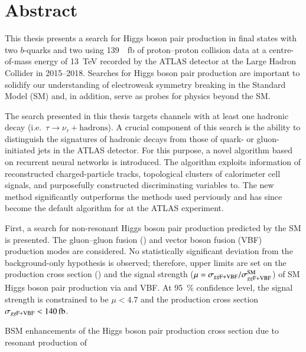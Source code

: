 \chapter*{Abstract}


This thesis presents a search for Higgs boson pair production in final states
with two $b$-quarks and two \tauleptons using \SI{139}{\per\femto\barn} of
proton--proton collision data at a centre-of-mass energy of \SI{13}{\TeV}
recorded by the ATLAS detector at the Large Hadron Collider in 2015--2018.
Searches for Higgs boson pair production are important to solidify our
understanding of electroweak symmetry breaking in the Standard Model (SM) and,
in addition, serve as probes for physics beyond the SM.

The search presented in this thesis targets channels with at least one hadronic
\taulepton decay (i.e.~$\tau \to \nu_{\tau} + \text{hadrons}$). A crucial
component of this search is the ability to distinguish the signatures of
hadronic \taulepton decays from those of quark- or gluon-initiated jets in the
ATLAS detector. For this purpose, a novel \tauid algorithm based on recurrent
neural networks is introduced. The algorithm exploits information of
reconstructed charged-particle tracks, topological clusters of calorimeter cell
signals, and purposefully constructed discriminating variables
to. The new \tauid method significantly outperforms the methods used
perviously and has since become the default algorithm for \tauid at the ATLAS
experiment.

First, a search for non-resonant Higgs boson pair production predicted by the SM
is presented. The gluon--gluon fusion (\ggF) and vector boson fusion (VBF)
production modes are considered. No statistically significant deviation from the
background-only hypothesis is observed; therefore, upper limits are set on the
production cross section (\xsecggfvbf) and the signal strength
($\mu = \sigma_{gg\text{F+VBF}} / \sigma_{gg\text{F+VBF}}^{\text{SM}}$) of SM Higgs boson pair
production via \ggF and VBF. At \SI{95}{\percent} confidence level, the signal
strength is constrained to be $\mu < \num{4.7}$ and the production cross section
$\xsecggfvbf < \SI{140}{\femto\barn}$.

BSM enhancements of the Higgs boson pair production cross section due to
resonant production of

